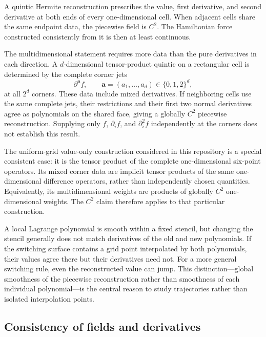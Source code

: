 \documentclass[11pt]{article}
\begin{document}
A quintic Hermite reconstruction prescribes the value, first derivative, and
second derivative at both ends of every one-dimensional cell.  When adjacent
cells share the same endpoint data, the piecewise field is \(C^2\).  The
Hamiltonian force constructed consistently from it is then at least
continuous.

The multidimensional statement requires more data than the pure derivatives
in each direction.  A \(d\)-dimensional tensor-product quintic on a rectangular
cell is determined by the complete corner jets
\begin{equation}
 \partial^{\boldsymbol a}f,
 \qquad
 \boldsymbol a=(a_1,\ldots,a_d)\in\{0,1,2\}^d,
 \label{eq:complete-hermite-jet}
\end{equation}
at all \(2^d\) corners.  These data include mixed derivatives.  If neighboring
cells use the same complete jets, their restrictions and their first two
normal derivatives agree as polynomials on the shared face, giving a globally
\(C^2\) piecewise reconstruction.  Supplying only \(f\), \(\partial_i f\), and
\(\partial_i^2f\) independently at the corners does not establish this result.

The uniform-grid value-only construction considered in this repository is a
special consistent case: it is the tensor product of the complete
one-dimensional six-point operators.  Its mixed corner data are implicit
tensor products of the same one-dimensional difference operators, rather than
independently chosen quantities.  Equivalently, its multidimensional weights
are products of globally \(C^2\) one-dimensional weights.  The \(C^2\) claim
therefore applies to that particular construction.

A local Lagrange polynomial is smooth within a fixed stencil, but changing the
stencil generally does not match derivatives of the old and new polynomials.
If the switching surface contains a grid point interpolated by both
polynomials, their values agree there but their derivatives need not.  For a
more general switching rule, even the reconstructed value can jump.  This
distinction---global smoothness of the piecewise reconstruction rather than
smoothness of each individual polynomial---is the central reason to study
trajectories rather than isolated interpolation points.

\subsection*{Consistency of fields and derivatives}
\end{document}
